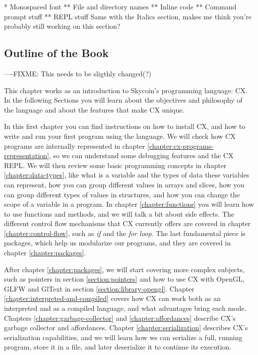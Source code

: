 \documentclass[11pt,fleqn,openany]{book} %
\begin{document}
* Monospaced font
** File and directory names
** Inline code
** Command prompt stuff
** REPL stuff
Same with the Italics section, makes me think you're probably still working on this section?
\subsection{Outline of the Book}

%

----FIXME: This needs to be sligthly changed(?)

This chapter works as an introduction to Skycoin's programming language: CX. In the following Sections you will learn about the objectives and philosophy of the language and about the features that make CX unique.

In this first chapter you can find instructions on how to install CX, and how to write and run your first program using the language. We will check how CX programs are internally represented in chapter \ref{chapter:cx-programs-representation}, so we can understand some debugging features and the CX REPL. We will then review some basic programming concepts in chapter \ref{chapter:data-types}, like what is a variable and the types of data these variables can represent, how you can group different values in arrays and slices, how you can group different types of values in structures, and how you can change the scope of a variable in a program. In chapter \ref{chapter:functions} you will learn how to use functions and methods, and we will talk a bit about side effects. The different control flow mechanisms that CX currently offers are covered in chapter \ref{chapter:control-flow}, such as \textit{if} and the \textit{for loop}. The last fundamental piece is packages, which help us modularize our programs, and they are covered in chapter \ref{chapter:packages}.

After chapter \ref{chapter:packages}, we will start covering more complex subjects, such as pointers in section \ref{section:pointers} and how to use CX with OpenGL, GLFW and GlText in section \ref{section:library-opengl}. Chapter \ref{chapter:interpreted-and-compiled} covers how CX can work both as an interpreted and as a compiled language, and what advantages bring each mode. Chapters \ref{chapter:garbage-collector} and \ref{chapter:affordances} describe CX's garbage collector and affordances.%
 Chapter \ref{chapter:serialization} describes CX's serialization capabilities, and we will learn how we can serialize a full, running program, store it in a file, and later deserialize it to continue its execution.
\end{document}
